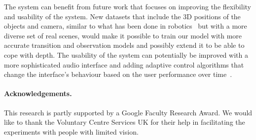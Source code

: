 \documentclass[runningheads]{llncs}
\DeclareRobustCommand{\tofix}[1]{{\sethlcolor{yellow}\hl{[#1]}}}
\begin{document}
The system can benefit from future work that focuses on improving the flexibility and usability of the system. 
New datasets that include the 3D positions of the objects and camera, similar to what has been done in robotics~\cite{active2017dataset} but with a more diverse set of real scenes, would make it possible to train our model with more accurate transition and observation models and possibly extend it to be able to cope with depth.
The usability of the system can potentially be improved with a more sophisticated audio interface and adding adaptive control algorithms that change the interface's behaviour based on the user performance over time~\cite{gallina2015}.  


\paragraph{{\bf Acknowledgements.}}\label{sec:acknowledge}
This research is partly supported by a Google Faculty Research Award.
We would like to thank the Voluntary Centre Services UK for their help in facilitating the experiments with people with limited vision. 



\end{document}
